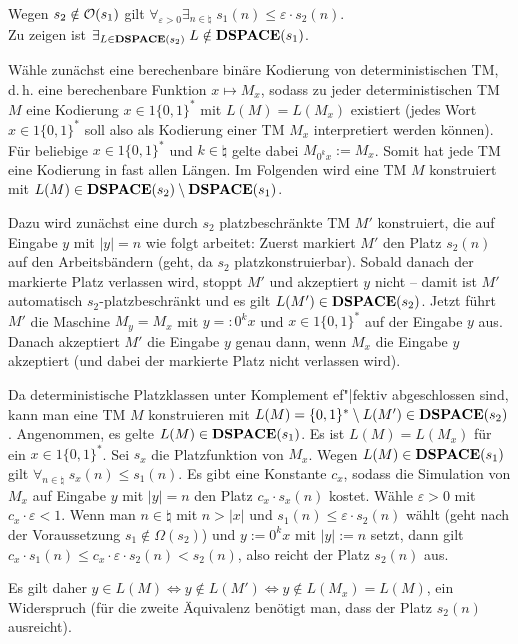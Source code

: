 \begin{Beweis}
    Wegen $s_2 \notin \mathcal{O}(s_1)$ gilt
    $\forall_{\varepsilon > 0} \exists_{n \in \natural}\; s_1(n) \le \varepsilon \cdot s_2(n)$.\\
    Zu zeigen ist $\exists_{L \in \mathbf{DSPACE}(s_2)}\; L \notin \mathbf{DSPACE}(s_1)$.
    
    Wähle zunächst eine berechenbare binäre Kodierung von deterministischen TM,
    d.\,h. eine berechenbare Funktion $x \mapsto M_x$, sodass zu jeder deterministischen TM $M$
    eine Kodierung $x \in 1\{0, 1\}^\ast$ mit $L(M) = L(M_x)$ existiert
    (jedes Wort $x \in 1\{0, 1\}^\ast$ soll also als Kodierung einer TM $M_x$ interpretiert werden
    können).
    Für beliebige $x \in 1\{0, 1\}^\ast$ und $k \in \natural$ gelte dabei
    $M_{0^k x} := M_x$.
    Somit hat jede TM eine Kodierung in fast allen Längen.
    Im Folgenden wird eine TM $M$ konstruiert mit $L(M) \in \mathbf{DSPACE}(s_2) \setminus \mathbf{DSPACE}(s_1)$.
    
    Dazu wird zunächst eine durch $s_2$ platzbeschränkte TM $M'$ konstruiert, die
    auf Eingabe $y$ mit $|y| = n$ wie folgt arbeitet:
    Zuerst markiert $M'$ den Platz $s_2(n)$ auf den Arbeitsbändern
    (geht, da $s_2$ platzkonstruierbar).
    Sobald danach der markierte Platz verlassen wird, stoppt $M'$ und akzeptiert $y$ nicht --
    damit ist $M'$ automatisch $s_2$-platzbeschränkt und es gilt $L(M') \in \mathbf{DSPACE}(s_2)$.
    Jetzt führt $M'$ die Maschine $M_y = M_x$ mit $y =: 0^k x$ und $x \in 1\{0, 1\}^\ast$
    auf der Eingabe $y$ aus.
    Danach akzeptiert $M'$ die Eingabe $y$ genau dann, wenn $M_x$ die Eingabe $y$ akzeptiert
    (und dabei der markierte Platz nicht verlassen wird).
    
    Da deterministische Platzklassen unter Komplement ef"|fektiv abgeschlossen sind,
    kann man eine TM $M$ konstruieren mit $L(M) = \{0, 1\}^\ast \setminus L(M') \in \mathbf{DSPACE}(s_2)$.
    Angenommen, es gelte $L(M) \in \mathbf{DSPACE}(s_1)$.
    Es ist $L(M) = L(M_x)$ für ein $x \in 1\{0, 1\}^\ast$.
    Sei $s_x$ die Platzfunktion von $M_x$.
    Wegen $L(M) \in \mathbf{DSPACE}(s_1)$ gilt $\forall_{n \in \natural}\; s_x(n) \le s_1(n)$.
    Es gibt eine Konstante $c_x$, sodass die Simulation von $M_x$ auf Eingabe $y$ mit $|y| = n$
    den Platz $c_x \cdot s_x(n)$ kostet.
    Wähle $\varepsilon > 0$ mit $c_x \cdot \varepsilon < 1$.
    Wenn man $n \in \natural$ mit $n > |x|$ und $s_1(n) \le \varepsilon \cdot s_2(n)$ wählt
    (geht nach der Voraussetzung $s_1 \notin \Omega(s_2)$)
    und $y := 0^k x$ mit $|y| := n$ setzt,
    dann gilt $c_x \cdot s_1(n) \le c_x \cdot \varepsilon \cdot s_2(n) < s_2(n)$,
    also reicht der Platz $s_2(n)$ aus.
    
    Es gilt daher $y \in L(M) \iff y \notin L(M') \iff y \notin L(M_x) = L(M)$, ein Widerspruch
    (für die zweite Äquivalenz benötigt man, dass der Platz $s_2(n)$ ausreicht).
\end{Beweis}

